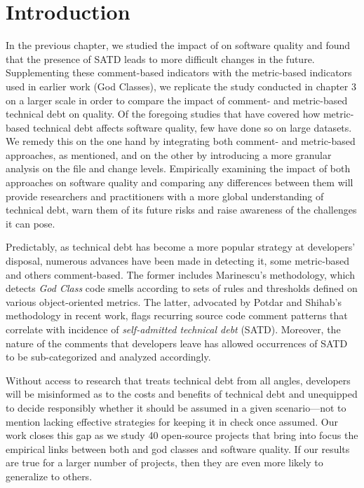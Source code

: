 \section{Introduction}
\label{chap4:sec:introduction}
\setlength\parindent{24pt} 

\revision In the previous chapter, we studied the impact of \SATD on software quality and found that the presence of SATD leads to more difficult changes in the future. Supplementing these comment-based indicators with the metric-based indicators used in earlier work \cite{zazworka2011investigating} (God Classes), we replicate the study conducted in chapter 3 on a larger scale in order to compare the impact of comment- and metric-based technical debt on quality. Of the foregoing studies that have covered how metric-based technical debt affects software quality, few have done so on large datasets. We remedy this on the one hand by integrating both comment- and metric-based approaches, as mentioned, and on the other by introducing a more granular analysis on the file and change levels. Empirically examining the impact of both approaches on software quality and comparing any differences between them will provide researchers and practitioners with a more global understanding of technical debt, warn them of its future risks and raise awareness of the challenges it can pose.

Predictably, as technical debt has become a more popular strategy at developers' disposal, numerous advances have been made in detecting it, some metric-based and others comment-based. The former includes Marinescu's \cite{marinescu2004detection} methodology, which detects \textit{God Class} code smells according to sets of rules and thresholds defined on various object-oriented metrics. The latter, advocated by Potdar and Shihab's \cite{ICSM_PotdarS14} methodology in recent work, flags recurring source code comment patterns that correlate with incidence of \textit{self-admitted technical debt} (SATD). Moreover, the nature of the comments that developers leave has allowed occurrences of SATD to be sub-categorized and analyzed accordingly.

Without access to research that treats technical debt from all angles, developers will be misinformed as to the costs and benefits of technical debt and unequipped to decide responsibly whether it should be assumed in a given scenario---not to mention lacking effective strategies for keeping it in check once assumed. Our work closes this gap as we study 40 open-source projects that bring into focus the empirical links between both \SATD and god classes and software quality. If our results are true for a larger number of projects, then they are even more likely to generalize to others. 

